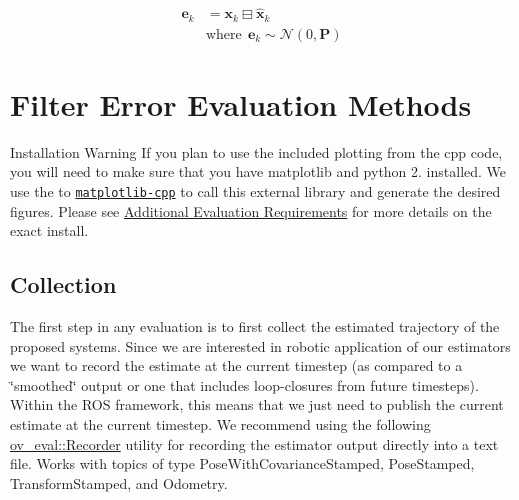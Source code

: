 \begin{align*} \mathbf{e}_k &= \mathbf{x}_{k} \boxminus \hat{\mathbf{x}}_{k} \\ &\textrm{where} ~~\mathbf{e}_k\sim \mathcal N (0, \mathbf P) \end{align*} \hypertarget{eval-error}{}\section{Filter Error Evaluation Methods}\label{eval-error}


\begin{DoxyParagraph}{Installation Warning}
If you plan to use the included plotting from the cpp code, you will need to make sure that you have matplotlib and python 2. installed. We use the to \href{https://github.com/lava/matplotlib-cpp}{\tt matplotlib-\/cpp} to call this external library and generate the desired figures. Please see \hyperlink{gs-installing_gs-install-oveval}{Additional Evaluation Requirements} for more details on the exact install.
\end{DoxyParagraph}
\hypertarget{eval-error_eval-ov-collection}{}\subsection{Collection}\label{eval-error_eval-ov-collection}
The first step in any evaluation is to first collect the estimated trajectory of the proposed systems. Since we are interested in robotic application of our estimators we want to record the estimate at the current timestep (as compared to a \char`\"{}smoothed\char`\"{} output or one that includes loop-\/closures from future timesteps). Within the R\+OS framework, this means that we just need to publish the current estimate at the current timestep. We recommend using the following \hyperlink{classov__eval_1_1Recorder}{ov\+\_\+eval\+::\+Recorder} utility for recording the estimator output directly into a text file. Works with topics of type {\ttfamily Pose\+With\+Covariance\+Stamped}, {\ttfamily Pose\+Stamped}, {\ttfamily Transform\+Stamped}, and {\ttfamily Odometry}.


